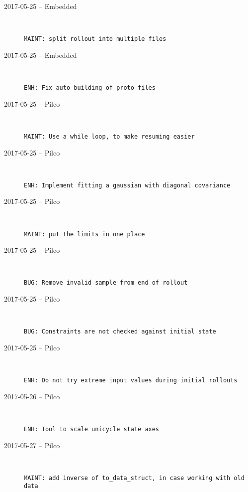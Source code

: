 \begin{description}
  \item[2017-05-25 -- Embedded] \hfill \
\begin{lstlisting}
MAINT: split rollout into multiple files
\end{lstlisting}


  \item[2017-05-25 -- Embedded] \hfill \
\begin{lstlisting}
ENH: Fix auto-building of proto files
\end{lstlisting}


  \item[2017-05-25 -- Pilco] \hfill \
\begin{lstlisting}
MAINT: Use a while loop, to make resuming easier
\end{lstlisting}


  \item[2017-05-25 -- Pilco] \hfill \
\begin{lstlisting}
ENH: Implement fitting a gaussian with diagonal covariance
\end{lstlisting}


  \item[2017-05-25 -- Pilco] \hfill \
\begin{lstlisting}
MAINT: put the limits in one place
\end{lstlisting}


  \item[2017-05-25 -- Pilco] \hfill \
\begin{lstlisting}
BUG: Remove invalid sample from end of rollout
\end{lstlisting}


  \item[2017-05-25 -- Pilco] \hfill \
\begin{lstlisting}
BUG: Constraints are not checked against initial state
\end{lstlisting}


  \item[2017-05-25 -- Pilco] \hfill \
\begin{lstlisting}
ENH: Do not try extreme input values during initial rollouts
\end{lstlisting}


  \item[2017-05-26 -- Pilco] \hfill \
\begin{lstlisting}
ENH: Tool to scale unicycle state axes
\end{lstlisting}


  \item[2017-05-27 -- Pilco] \hfill \
\begin{lstlisting}
MAINT: add inverse of to_data_struct, in case working with old data
\end{lstlisting}



\end{description}
